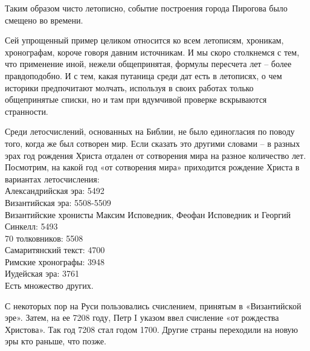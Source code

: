 Таким образом чисто летописно, событие построения города Пирогова было смещено во времени.

Сей упрощенный пример целиком относится ко всем летописям, хроникам, хронографам, короче говоря давним источникам. И мы скоро столкнемся с тем, что применение иной, нежели общепринятая, формулы пересчета лет – более правдоподобно. И с тем, какая путаница среди дат есть в летописях, о чем историки предпочитают молчать, используя в своих работах только общепринятые списки, но и там при вдумчивой проверке вскрываются странности.

Среди летосчислений, основанных на Библии, не было единогласия по поводу того, когда же был сотворен мир. Если сказать это другими словами – в разных эрах год рождения Христа отдален от сотворения мира на разное количество лет. Посмотрим, на какой год «от сотворения мира» приходится рождение Христа в вариантах летосчисления:\\

\noindent
Александрийская эра: 5492\\
Византийская эра: 5508-5509\\
Византийские хронисты Максим Исповедник, Феофан Исповедник и Георгий Синкелл: 5493\\
70 толковников: 5508\\
Самаритянский текст: 4700\\
Римские хронографы: 3948\\
Иудейская эра: 3761\\


Есть множество других.

С некоторых пор на Руси пользовались счислением, принятым в «Византийской эре». Затем, на ее 7208 году, Петр I указом ввел счисление «от рождества Христова». Так год 7208 стал годом 1700. Другие страны переходили на новую эры кто раньше, что позже.

